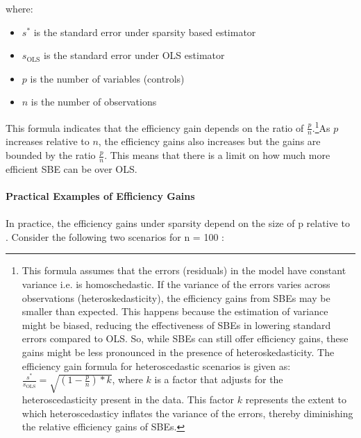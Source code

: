 where:
\begin{itemize}
    \item $s^*$ is the standard error under sparsity based estimator
    \item $s_\text{OLS}$ is the standard error under OLS estimator
    \item $p$ is the number of variables (controls) 
    \item $n$ is the number of observations
\end{itemize}
This formula indicates that the efficiency gain depends on the ratio of $\frac{p}{n}$.\footnote{This formula assumes that the errors (residuals) in the model have constant variance i.e. is homoschedastic. If the variance of the errors varies across observations (heteroskedasticity), the efficiency gains from SBEs may be smaller than expected. This happens because the estimation of variance might be biased, reducing the effectiveness of SBEs in lowering standard errors compared to OLS. So, while SBEs can still offer efficiency gains, these gains might be less pronounced in the presence of heteroskedasticity. The efficiency gain formula for heteroscedastic scenarios is given as:$\frac{s^*}{s_{\text{OLS}}} = \sqrt{(1 - \frac{p}{n})*k}$, where $k$ is a factor that adjusts for the heteroscedasticity present in the data. This factor $k$ represents the extent to which heteroscedasticy inflates the variance of the errors, thereby diminishing the relative efficiency gains of SBEs.}As $p$ increases relative to $n$, the efficiency gains also increases but the gains are bounded by the ratio $\frac{p}{n}$. This means that there is a limit on how much more efficient SBE can be over OLS. 
\\
\\
\textbf{Practical Examples of Efficiency Gains}\\
\\
In practice, the efficiency gains under sparsity depend on the size of  p  relative to . Consider the following two scenarios for  n = 100 :
